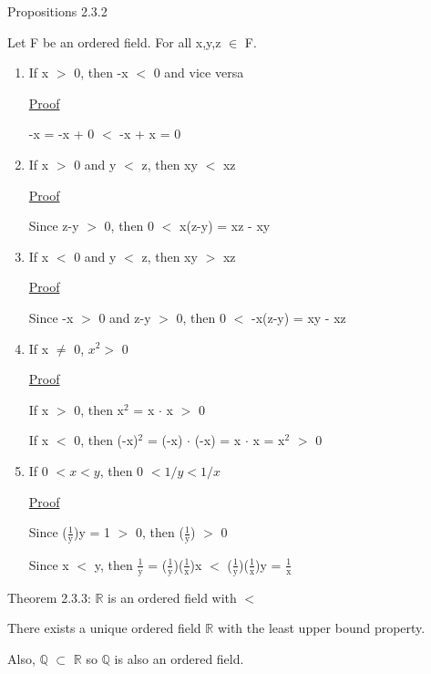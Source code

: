 { \color{blue} Propositions 2.3.2} 

	\qquad Let F be an ordered field. For all x,y,z $\in$ F.
	\begin{enumerate}[label=(\alph*), leftmargin=2cm, itemsep=0.4em]
		\item If x $>$ 0, then -x $<$ 0 and vice versa
	
			{ \color{magenta} \underline{Proof} } 
	
				-x = -x + 0 $<$ -x + x = 0

		\item If x $>$ 0 and y $<$ z, then xy $<$ xz
	
			{ \color{magenta} \underline{Proof} } 
		
				Since z-y $>$ 0, then 0 $<$ x(z-y) = xz - xy

		\item If x $ < $ 0 and y $ < $ z, then xy $ > $ xz

			{ \color{magenta} \underline{Proof} } 
		
				Since -x $>$ 0 and z-y $>$ 0, then 0 $<$ -x(z-y) = xy - xz
	
		\item If x $\neq$ 0, $x^2 > $ 0

			{ \color{magenta} \underline{Proof} } 
		
				If x $>$ 0, then x$^\text{2}$ = x $\cdot$ x $>$ 0

				If x $<$ 0, then (-x)$^\text{2}$ = (-x) $\cdot$ (-x)
				= x $\cdot$ x = x$^\text{2}$ $>$ 0
	
		\item If 0 $< x < y$, then 0 $< 1/y < 1/x$

			{ \color{magenta} \underline{Proof} } 
		
				Since ($\frac{1}{\text{y}}$)y = 1 $>$ 0, then ($\frac{1}{\text{y}}$) $>$ 0

				Since x $<$ y, then $\frac{1}{\text{y}}$
				= ($\frac{1}{\text{y}}$)($\frac{1}{\text{x}}$)x
				$<$ ($\frac{1}{\text{y}}$)($\frac{1}{\text{x}}$)y = $\frac{1}{\text{x}}$ \\
	\end{enumerate}

{\color{red} Theorem 2.3.3: $\mathbb{R}$ is an ordered field with $<$ }

	\qquad There exists a unique ordered field $ \mathbb{R} $ with the least upper bound property.

	\qquad Also, $ \mathbb{Q} $  $\subset$ $ \mathbb{R} $ so $\mathbb{Q}$ is also an ordered field. \\

